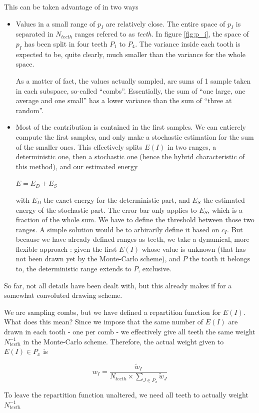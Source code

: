 \documentclass[./thesis.tex]{subfiles}
\begin{document}
This can be taken advantage of in two ways
\begin{itemize}
\item
Values in a small range of $p_I$ are relatively close. The entire space of $p_I$ is separated in $N_{teeth}$ ranges refered to as \emph{teeth}. In figure \ref{fig:p_i}, the space of $p_I$ has been split in four teeth $P_1$ to $P_4$. The variance inside each tooth is expected to be, quite clearly, much smaller than the variance for the whole space.

As a matter of fact, the values actually sampled, are sums of 1 sample taken in each subspace, so-called ``combs''.
Essentially, the sum of ``one large, one average and one small'' has a lower variance than the sum of ``three at random''.
\item
Most of the contribution is contained in the first samples. We can entierely compute the first samples, and only make a stochastic estimation for the sum of the smaller ones. This effectively splits $E(I)$ in two ranges, a deterministic one, then a stochastic one (hence the hybrid characteristic of this method), and our estimated energy

$E = E_D + E_S$

with $E_D$ the exact energy for the deterministic part, and $E_S$ the estimated energy of the stochastic part. The error bar only applies to $E_S$, which is a fraction of the whole sum.
We have to define the threshold between those two ranges. A simple solution would be to arbirarily define it based on $c_I$.
But because we have already defined ranges as teeth, we take a dynamical, more flexible approach : given the first $E(I)$ whose value is unknown (that has not been drawn yet by the Monte-Carlo scheme), and $P$ the tooth it belongs to, the deterministic range extends to $P$, exclusive.
\end{itemize}

So far, not all details have been dealt with, but this already makes if for a somewhat convoluted drawing scheme.

We are sampling combs, but we have defined a repartition function for $E(I)$. What does this mean? Since we impose that the same number of $E(I)$ are drawn in each tooth - one per comb - we effectively give all teeth the same weight $N_{teeth}^{-1}$ in the Monte-Carlo scheme. Therefore, the actual weight given to $E(I) \in P_x$ is

$$w_I = \frac{\tilde w_I}{N_{teeth} \times \sum_{J \in P_x} \tilde w_J}$$

To leave the repartition function unaltered, we need all teeth to actually weight $N_{teeth}^{-1}$
\end{document}
